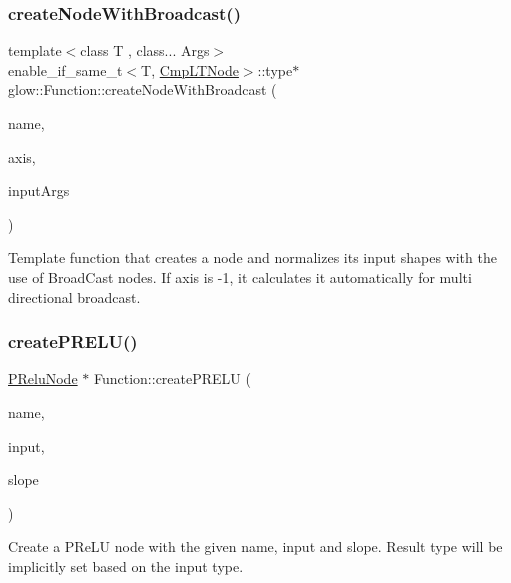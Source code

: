 \subsubsection{\texorpdfstring{create\+Node\+With\+Broadcast()}{createNodeWithBroadcast()}\hspace{0.1cm}{\footnotesize\ttfamily [2/2]}}
{\footnotesize\ttfamily template$<$class T , class... Args$>$ \\
enable\+\_\+if\+\_\+same\+\_\+t$<$T, \hyperlink{classglow_1_1_cmp_l_t_node}{Cmp\+L\+T\+Node}$>$\+::type$\ast$ glow\+::\+Function\+::create\+Node\+With\+Broadcast (\begin{DoxyParamCaption}\item[{const std\+::string \&}]{name,  }\item[{int}]{axis,  }\item[{Args \&\&...}]{input\+Args }\end{DoxyParamCaption})\hspace{0.3cm}{\ttfamily [inline]}}

Template function that creates a node and normalizes its input shapes with the use of Broad\+Cast nodes. If axis is -\/1, it calculates it automatically for multi directional broadcast. \mbox{\label{classglow_1_1_function_a128f705eed37efbbb40cc644c36dd16e}} 
\subsubsection{\texorpdfstring{create\+P\+R\+E\+L\+U()}{createPRELU()}\hspace{0.1cm}{\footnotesize\ttfamily [1/2]}}
{\footnotesize\ttfamily \hyperlink{classglow_1_1_p_relu_node}{P\+Relu\+Node} $\ast$ Function\+::create\+P\+R\+E\+LU (\begin{DoxyParamCaption}\item[{llvm\+::\+String\+Ref}]{name,  }\item[{\hyperlink{structglow_1_1_node_value}{Node\+Value}}]{input,  }\item[{\hyperlink{structglow_1_1_node_value}{Node\+Value}}]{slope }\end{DoxyParamCaption})}

Create a P\+Re\+LU node with the given {\ttfamily name}, {\ttfamily input} and {\ttfamily slope}. Result type will be implicitly set based on the {\ttfamily input} type. \mbox{\label{classglow_1_1_function_a87131023c229abbfbc109c06485106a7}} 
